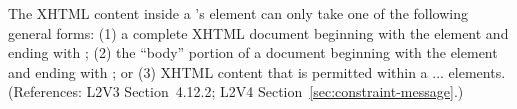 The XHTML content inside a \Constraint's  element can only
take one of the following general forms: (1) a complete XHTML document
beginning with the element  and ending with ;
(2) the ``body'' portion of a document beginning with the element
 and ending with ; or (3) XHTML content that
is permitted within a  ...  elements.
(References: L2V3 Section~4.12.2; L2V4 Section~\ref{sec:constraint-message}.)
